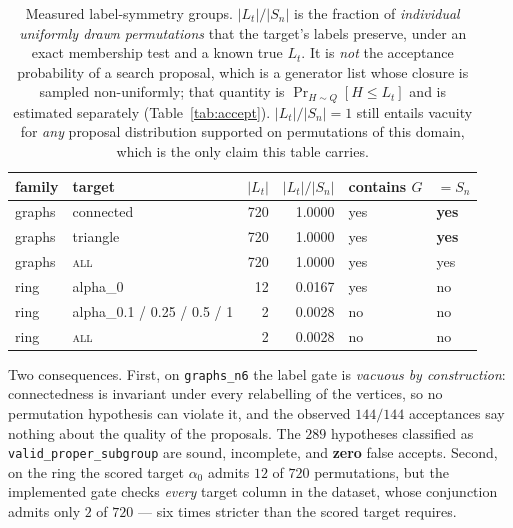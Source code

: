 \documentclass{neurips_2024}
\begin{document}
\begin{table}[t]
\centering
\caption{Measured label-symmetry groups. $|L_t|/|S_n|$ is the fraction of \emph{individual
uniformly drawn permutations} that the target's labels preserve, under an exact
membership test and a known true $L_t$. It is \emph{not} the acceptance probability of a
search proposal, which is a generator list whose closure is sampled non-uniformly; that
quantity is $\Pr_{H\sim Q}[H \le L_t]$ and is estimated separately (Table~\ref{tab:accept}).
$|L_t|/|S_n| = 1$ still entails vacuity for \emph{any} proposal distribution supported on
permutations of this domain, which is the only claim this table carries.}
\label{tab:semantics}
\small
\begin{tabular}{llrrll}
\toprule
family & target & $|L_t|$ & $|L_t|/|S_n|$ & contains $G$ & $=S_n$ \\
\midrule
graphs & connected & 720 & 1.0000 & yes & \textbf{yes} \\
graphs & triangle  & 720 & 1.0000 & yes & \textbf{yes} \\
graphs & \textsc{all} & 720 & 1.0000 & yes & yes \\
ring & alpha\_0 & 12 & 0.0167 & yes & no \\
ring & alpha\_0.1 / 0.25 / 0.5 / 1 & 2 & 0.0028 & no & no \\
ring & \textsc{all} & 2 & 0.0028 & no & no \\
\bottomrule
\end{tabular}
\end{table}

Two consequences. First, on \texttt{graphs\_n6} the label gate is \emph{vacuous by
construction}: connectedness is invariant under every relabelling of the vertices, so no
permutation hypothesis can violate it, and the observed $144/144$ acceptances say nothing
about the quality of the proposals. The $289$ hypotheses classified as
\texttt{valid\_proper\_subgroup} are sound, incomplete, and \textbf{zero} false accepts.
Second, on the ring the scored target $\alpha_0$ admits $12$ of $720$ permutations, but the
implemented gate checks \emph{every} target column in the dataset, whose conjunction admits
only $2$ of $720$ --- six times stricter than the scored target requires.
\end{document}
